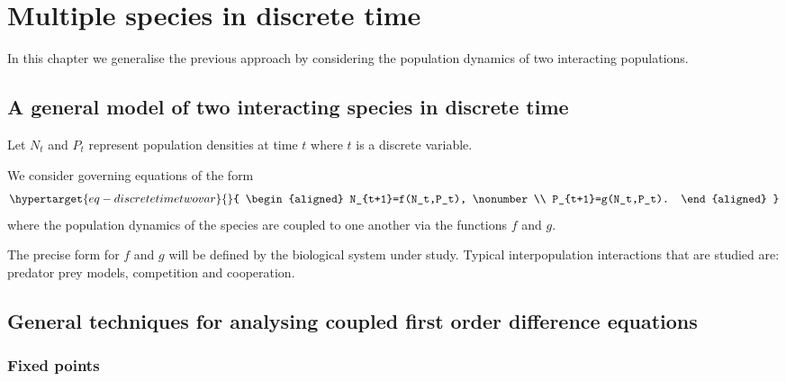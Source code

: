 \documentclass[
  letterpaper,
  DIV=11,
  numbers=noendperiod]{scrreprt}
\begin{document}
\hypertarget{multiple-species-in-discrete-time}{%
\chapter{Multiple species in discrete
time}\label{multiple-species-in-discrete-time}}

In this chapter we generalise the previous approach by considering the
population dynamics of two interacting populations.

\hypertarget{a-general-model-of-two-interacting-species-in-discrete-time}{%
\section{A general model of two interacting species in discrete
time}\label{a-general-model-of-two-interacting-species-in-discrete-time}}

Let \(N_t\) and \(P_t\) represent population densities at time \(t\)
where \(t\) is a discrete variable.

We consider governing equations of the form
\begin{equation}\protect\hypertarget{eq-discretetimetwovar}{}{
\begin{aligned}
N_{t+1}=f(N_t,P_t), \nonumber \\
P_{t+1}=g(N_t,P_t).
\end{aligned}
}\label{eq-discretetimetwovar}\end{equation} where the population
dynamics of the species are coupled to one another via the functions
\(f\) and \(g\).

The precise form for \(f\) and \(g\) will be defined by the biological
system under study. Typical interpopulation interactions that are
studied are: predator prey models, competition and cooperation.

\hypertarget{general-techniques-for-analysing-coupled-first-order-difference-equations}{%
\section{General techniques for analysing coupled first order difference
equations}\label{general-techniques-for-analysing-coupled-first-order-difference-equations}}

\hypertarget{fixed-points-3}{%
\subsection{Fixed points}\label{fixed-points-3}}
\end{document}
